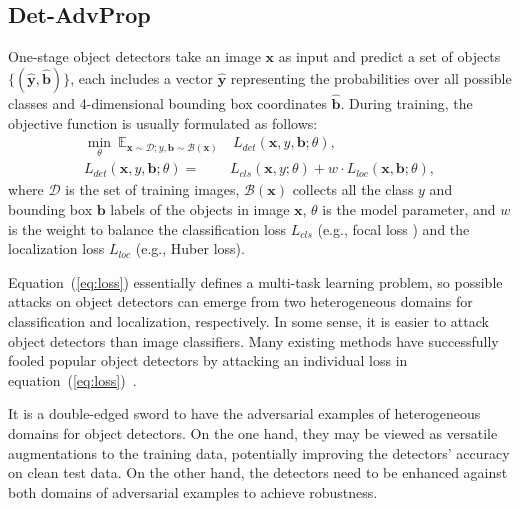 \documentclass[final]{cvpr}
\begin{document}
\subsection{Det-AdvProp}
\label{sec:det-advprop}
One-stage object detectors take an image $\textbf{x}$ as input and predict a set of objects $\{(\hat{\textbf{y}},\hat{\textbf{b}})\}$, each includes a vector $\hat{\textbf{y}}$ representing the probabilities over all possible classes and 4-dimensional bounding box coordinates $\hat{\textbf{b}}$.
During training, the objective function is usually formulated as follows:
\begin{align}
\min_\theta\ \mathbb{E}_{\textbf{x}\sim\mathcal{D}; y,\textbf{b}\sim\mathcal{B}(\textbf{x})}&\ L_{det}(\textbf{x}, y,\textbf{b}; \theta), \\
L_{det}(\textbf{x}, y,\textbf{b}; \theta) =& L_{cls}(\textbf{x}, y; \theta) + w \cdot L_{loc}(\textbf{x}, \textbf{b}; \theta), \label{eq:loss}
\end{align}
where $\mathcal{D}$ is the set of training images, $\mathcal{B}(\textbf{x})$ collects all the class $y$ and bounding box $\textbf{b}$ labels of the objects in image $\textbf{x}$, $\theta$ is the model parameter, and $w$ is the weight to balance the classification loss $L_{cls}$ (e.g., focal loss \cite{lin2017focal}) and the localization loss $L_{loc}$ (e.g., Huber loss).

Equation~(\ref{eq:loss}) essentially defines a multi-task learning problem, so possible attacks on object detectors can emerge from two heterogeneous domains for classification and localization, respectively. In some sense, it is easier to attack object detectors  than image classifiers. Many existing methods have successfully fooled popular object detectors by attacking an individual loss in equation~(\ref{eq:loss})~\cite{xie2017adversarial, chen2019shapeshifter, kevin2018phyattack}.

It is a double-edged sword to have the adversarial examples of heterogeneous domains for object detectors. On the one hand, they may be viewed as versatile augmentations to the training data, potentially improving the detectors' accuracy on clean test data.
On the other hand, the detectors need to be enhanced against both domains of adversarial examples to achieve robustness. 

\vspace{-10pt}
\end{document}
